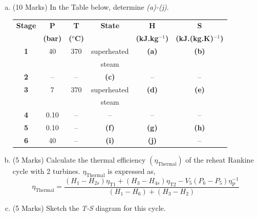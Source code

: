 \documentclass[12pt,twoside]{report}
\newcommand{\frc}{\displaystyle\frac}
\begin{document}
\begin{description}
\begin{enumerate}[(a)]
\item (10 Marks) In the Table below, determine {\it (a)-(j)}.\\
\begin{center}
\begin{tabular} {||c | c c c c c || }
\hline\hline
{\bf Stage} & {\bf P}    & {\bf T}        & {\bf State}    & {\bf H}             & {\bf S}                  \\
            & {\bf (bar)}& {\bf ($^{o}$C)} &               & {\bf (kJ.kg$^{-1}$)} & {\bf (kJ.(kg.K)$^{-1}$)} \\
\hline\hline
 {\bf 1 }   & 40         & 370            &   superheated  & {\bf (a)}           & {\bf (b)}                 \\
            &            &                &   steam        &                     &                           \\
 {\bf 2 }   &  --        &  --            &     {\bf (c)}  & --                  &   --                      \\
 {\bf 3 }   & 7          & 370            &   superheated  & {\bf (d)}           & {\bf (e)}                 \\
            &            &                &   steam        &                     &                           \\
 {\bf 4 }   & 0.10       & --             &     --         & --                   & --                      \\
 {\bf 5 }   & 0.10       & --             &   {\bf (f)}    & {\bf (g)}           & {\bf (h)}                 \\
 {\bf 6 }   & 40         & --             &   {\bf (i)}    & {\bf (j)}           & --                       \\

\hline\hline
\end{tabular}
\end{center}


\item (5 Marks) Calculate the thermal efficiency $\left(\eta_{\text{Thermal}}\right)$ of the reheat Rankine cycle with 2 turbines. $\eta_{\text{Thermal}}$ is expressed as,
\begin{displaymath}
\eta_{\text{Thermal}} = \frc{ \left(H_{1}-H_{2s}\right)\eta_{\text{T1}} + \left(H_{3}-H_{4s}\right)\eta_{\text{T2}} - V_{5}\left(P_{6}-P_{5}\right)\eta_{\text{P}}^{-1}} {\left(H_{1}-H_{6}\right)+\left(H_{3}-H_{2}\right)}
\end{displaymath}
\item (5 Marks) Sketch the {\it T-S} diagram for this cycle.


\end{enumerate}
\end{description}
\end{document}

